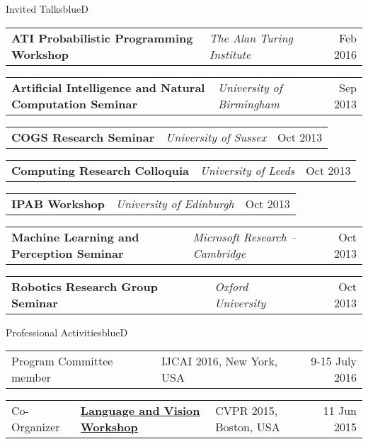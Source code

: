 \documentclass[a4paper]{article}
\makeatletter
\newlength{\itemtextwidth}
\newenvironment{talk}[3]
{ \item
  \begin{tabular*}{\itemtextwidth}{@{}l@{\hspace*{2ex}}l@{\extracolsep{\fill}}r@{}}
    \textbf{#1} & \textit{#2} & #3
  \end{tabular*}
  \vspace*{-2pt}
} {}
\newenvironment{workshop}[5]
{ \item
  \begin{tabular*}{\itemtextwidth}{@{}ll@{\hspace*{1ex}}l@{\extracolsep{\fill}}r@{}}
    #1 & \href{#3}{\textbf{#2}} & {\small #4} & #5
  \end{tabular*}
  \vspace*{-2pt}
} {}
\def\item{\addtocounter{enumi}{-2}\oldItem}
\makeatother
\begin{document}
\begin{region}{Invited Talks}{blueD}
  \begin{talk} {ATI Probabilistic Programming Workshop}
    {The Alan Turing Institute}
    {Feb 2016}
  \end{talk}
  \begin{talk} {Artificial Intelligence and Natural Computation Seminar}
    {University of Birmingham}
    {Sep 2013}
  \end{talk}
  \begin{talk}{COGS Research Seminar}
    {University of Sussex}
    {Oct 2013}
  \end{talk}
  \begin{talk} {Computing Research Colloquia}
    {University of Leeds}
    {Oct 2013}
  \end{talk}
  \begin{talk} {IPAB Workshop}
    {University of Edinburgh}
    {Oct 2013}
  \end{talk}
  \begin{talk} {Machine Learning and Perception Seminar}
    {Microsoft Research -- Cambridge}
    {Oct 2013}
  \end{talk}
  \begin{talk} {Robotics Research Group Seminar}
    {Oxford University}
    {Oct 2013}
  \end{talk}
\end{region}

\begin{region}{Professional Activities}{blueD}
  \begin{workshop} {Program Committee member}
    {}
    {}
    {IJCAI 2016, New York, USA}
    {9-15 July 2016}
  \end{workshop}
  \begin{workshop} {Co-Organizer}
    {Language and Vision Workshop}
    {www.languageandvision.com}
    {CVPR 2015, Boston, USA}
    {11 Jun 2015}
  \end{workshop}
\end{region}

\end{document}

